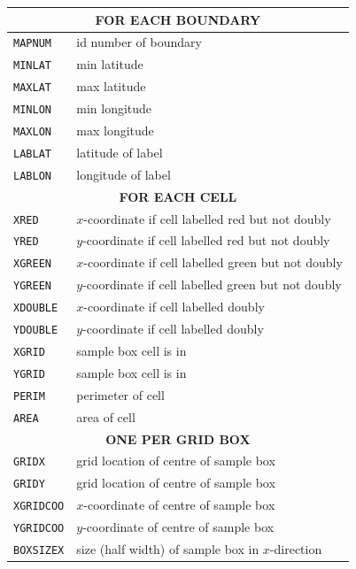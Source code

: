 \documentclass{article}
\begin{document}
\begin{table}
  \begin{tabular}{ll}
    \hline
    \multicolumn{2}{c}{\textbf{FOR EACH BOUNDARY}} \\
    \hline
    \texttt{MAPNUM}   & id number of boundary \\  
    \texttt{MINLAT}   & min latitude      \\
    \texttt{MAXLAT}   & max latitude      \\
    \texttt{MINLON}   & min longitude     \\
    \texttt{MAXLON}   & max longitude     \\
    \texttt{LABLAT}   & latitude of label \\
    \texttt{LABLON}   & longitude of label\\
    \hline
    \multicolumn{2}{c}{\textbf{FOR EACH CELL}} \\
    \hline
    \texttt{XRED}     & $x$-coordinate if cell labelled red but not doubly\\
    \texttt{YRED}     & $y$-coordinate if cell labelled red but not doubly\\
    \texttt{XGREEN}   & $x$-coordinate if cell labelled green but not doubly\\
    \texttt{YGREEN}   & $y$-coordinate if cell labelled green but not doubly\\
    \texttt{XDOUBLE}  & $x$-coordinate if cell labelled doubly\\ 
    \texttt{YDOUBLE}  & $y$-coordinate if cell labelled doubly\\
    \texttt{XGRID}    & sample box cell is in \\
    \texttt{YGRID}    & sample box cell is in \\
    \texttt{PERIM}    & perimeter of cell \\
    \texttt{AREA}     & area of cell \\
    \hline
    \multicolumn{2}{c}{\textbf{ONE PER GRID BOX}} \\
    \hline
    \texttt{GRIDX}    & grid location of centre of sample box \\
    \texttt{GRIDY}    & grid location of centre of sample box \\
    \texttt{XGRIDCOO} & $x$-coordinate of centre of sample box \\
    \texttt{YGRIDCOO} & $y$-coordinate of centre of sample box \\
    \texttt{BOXSIZEX} & size (half width) of sample box in $x$-direction \\

\end{tabular}
\end{table}
\end{document}
